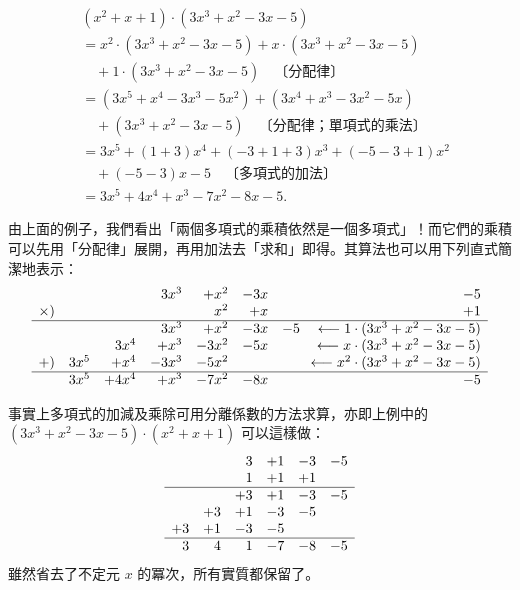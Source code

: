 \begin{solution*}
\begin{align*}
  &(x^2+x+1) \cdot (3x^3+x^2-3x-5) \\
  &= x^2 \cdot (3x^3+x^2-3x-5) + x \cdot (3x^3+x^2-3x-5) \\
  &\quad + 1 \cdot (3x^3+x^2-3x-5) \quad \text{〔分配律〕} \\
  &= (3x^5+x^4-3x^3-5x^2) + (3x^4+x^3-3x^2-5x) \\
  &\quad + (3x^3+x^2-3x-5) \quad \text{〔分配律；單項式的乘法〕} \\
  &= 3x^5 + (1+3)x^4 + (-3+1+3)x^3 + (-5-3+1)x^2 \\
  &\quad + (-5-3)x - 5 \quad \text{〔多項式的加法〕} \\
  &= 3x^5 + 4x^4 + x^3 - 7x^2 - 8x - 5.
\end{align*}

由上面的例子，我們看出「兩個多項式的乘積依然是一個多項式」！而它們的乘積可以先用「分配律」展開，再用加法去「求和」即得。其算法也可以用下列直式簡潔地表示：
\begin{equation*}
\begin{array}{rrrrrrr}
  &  &  & 3x^3 & +x^2 & -3x & -5 \\
\times) &  &  &  & x^2 & +x & +1 \\ \hline
  &  &  & 3x^3 & +x^2 & -3x & -5 \quad \longleftarrow 1 \cdot (3x^3+x^2-3x-5) \\
  &  & 3x^4 & +x^3 & -3x^2 & -5x & \quad \longleftarrow x \cdot (3x^3+x^2-3x-5) \\
+) & 3x^5 & +x^4 & -3x^3 & -5x^2 &  & \quad \longleftarrow x^2 \cdot (3x^3+x^2-3x-5) \\ \hline
  & 3x^5 & +4x^4 & +x^3 & -7x^2 & -8x & -5
\end{array}
\end{equation*}

事實上多項式的加減及乘除可用分離係數的方法求算，亦即上例中的 $(3x^3+x^2-3x-5) \cdot (x^2+x+1)$ 可以這樣做：
\begin{equation*}
\begin{array}{rrrrrr}
  &  & 3 & +1 & -3 & -5 \\
  &  & 1 & +1 & +1 &  \\ \hline
  &  & +3 & +1 & -3 & -5 \\
  & +3 & +1 & -3 & -5 &  \\
+3 & +1 & -3 & -5 &  &  \\ \hline
3 & 4 & 1 & -7 & -8 & -5
\end{array}
\end{equation*}
雖然省去了不定元 $x$ 的冪次，所有實質都保留了。
\end{solution*}

